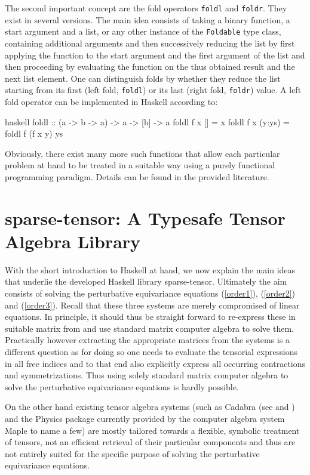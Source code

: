 The second important concept are the fold operators \texttt{foldl} and \texttt{foldr}. They exist in several versions. The main idea consists of taking a binary function, a start argument and a list, or any other instance of the \texttt{Foldable} type class, containing additional arguments and then successively reducing the list by first applying the function to the start argument and the first argument of the list and then proceeding by evaluating the function on the thus obtained result and the next list element. One can distinguish folds by whether they reduce the list starting from its first (left fold, \texttt{foldl}) or its last (right fold, \texttt{foldr}) value. A left fold operator can be implemented in Haskell according to:
\begin{center}
\begin{cminted}{haskell}
foldl :: (a -> b -> a) -> a -> [b] -> a 
foldl f x [] = x 
foldl f x (y:ys) = foldl f (f x y) ys
\end{cminted}
\end{center}
Obviously, there exist many more such functions that allow each particular problem at hand to be treated in a suitable way using a purely functional programming paradigm. Details can be found in the provided literature.

\section{sparse-tensor: A Typesafe Tensor Algebra Library }
With the short introduction to Haskell at hand, we now explain the main ideas that underlie the developed Haskell library sparse-tensor. Ultimately the aim consists of solving the perturbative equivariance equations (\ref{order1}), (\ref{order2}) and (\ref{order3}). Recall that these three systems are merely compromised of linear equations. In principle, it should thus be straight forward to re-express these in suitable matrix from and use standard matrix computer algebra to solve them. Practically however extracting the appropriate matrices from the systems is a different question as for doing so one needs to evaluate the tensorial expressions in all free indices and to that end also
explicitly express all occurring contractions and symmetrizations.
Thus using solely standard matrix computer algebra to solve the perturbative equivariance equations is hardly possible.

On the other hand existing tensor algebra systems (such as Cadabra (see \cite{cadabra1} and \cite{cadabra2}) and the Physics package \cite{MaplePhysics} currently provided by the computer algebra system Maple to name a few) are mostly tailored towards a flexible, symbolic treatment of tensors, not an efficient retrieval of their particular components and thus are not entirely suited for the specific purpose of solving the perturbative equivariance equations. 

